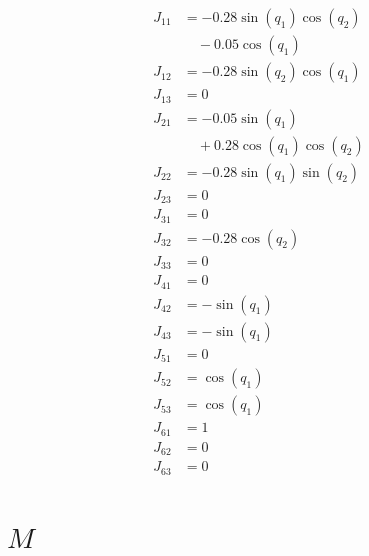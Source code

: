 \documentclass[11pt]{article}
\begin{document}
\begin{align*}
J_{11} &= - 0.28 \sin{\left(q_{1} \right)} \cos{\left(q_{2} \right)} \\
&\quad - 0.05 \cos{\left(q_{1} \right)} \\
J_{12} &= - 0.28 \sin{\left(q_{2} \right)} \cos{\left(q_{1} \right)} \\
J_{13} &= 0 \\
J_{21} &= - 0.05 \sin{\left(q_{1} \right)} \\
&\quad + 0.28 \cos{\left(q_{1} \right)} \cos{\left(q_{2} \right)} \\
J_{22} &= - 0.28 \sin{\left(q_{1} \right)} \sin{\left(q_{2} \right)} \\
J_{23} &= 0 \\
J_{31} &= 0 \\
J_{32} &= - 0.28 \cos{\left(q_{2} \right)} \\
J_{33} &= 0 \\
J_{41} &= 0 \\
J_{42} &= - \sin{\left(q_{1} \right)} \\
J_{43} &= - \sin{\left(q_{1} \right)} \\
J_{51} &= 0 \\
J_{52} &= \cos{\left(q_{1} \right)} \\
J_{53} &= \cos{\left(q_{1} \right)} \\
J_{61} &= 1 \\
J_{62} &= 0 \\
J_{63} &= 0
\end{align*}


\section*{$M$}
\end{document}
